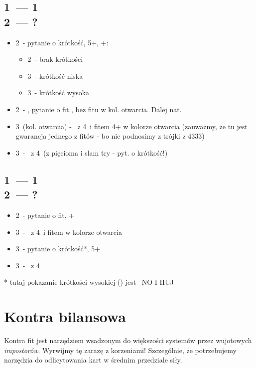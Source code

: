 \documentclass[12pt, a4paper]{article}
\begin{document}
\subsection{1\clubs\ --- 1\hearts \\ 2\hearts\ --- ?}
\begin{itemize}
    \item 2\spades\ - pytanie o krótkość, 5+\spades, \inv+:
    \begin{itemize}
        \item 2\nt\ - brak krótkości
        \item 3\clubs\ - krótkość niska
        \item 3\diams\ - krótkość wysoka
    \end{itemize}
    \item 2\nt\ - \inv, pytanie o fit \spades, bez fitu w kol. otwarcia. Dalej nat.
    \item 3\clubs\ (kol. otwarcia) - \inv\ z 4\spades\ i fitem 4+ w kolorze otwarcia
    (zauważmy, że tu jest gwarancja jednego z fitów - bo nie podnosimy z trójki z 4333)
    \item 3\diams\ - \gf\ z 4\spades\ (z pięcioma i slam try - pyt. o krótkość!)
\end{itemize}

\subsection{1\clubs\ --- 1\spades \\ 2\spades\ --- ?}
\begin{itemize}
    \item 2\nt\ - pytanie o fit, \inv+
    \item 3\clubs\ - \inv\ z 4\spades\ i fitem w kolorze otwarcia
    \item 3\diams\ - pytanie o krótkość*, 5+\spades
    \item 3\hearts\ - \gf\ z 4\spades
\end{itemize}
* tutaj pokazanie krótkości wysokiej (\hearts) jest \gf\ NO I HUJ



\pagebreak
\section{Kontra bilansowa}
Kontra fit jest narzędziem wsadzonym do większości systemów przez wujotowych \emph{impostorów}. Wyrwijmy tę zarazę z korzeniami!
Szczególnie, że potrzebujemy narzędzia do odlicytowania kart w średnim przedziale siły.
\end{document}
